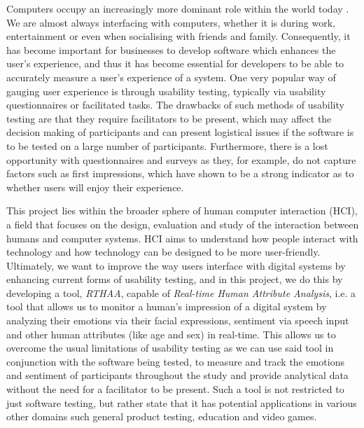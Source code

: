 \documentclass[12pt, a4paper]{article}
\newcommand{\np}
    {
    \vskip 0.4cm
    }
\begin{document}
Computers occupy an increasingly more dominant role within the world today \citep{statista}. We are almost always interfacing with computers, whether it is during work, entertainment or even when socialising with friends and family. Consequently, it has become important for businesses to develop software which enhances the user's experience, and thus it has become essential for developers to be able to accurately measure a user's experience of a system. One very popular way of gauging user experience is through usability testing, typically via usability questionnaires or facilitated tasks. The drawbacks of such methods of usability testing are that they require facilitators to be present, which may affect the decision making of participants and can present logistical issues if the software is to be tested on a large number of participants. Furthermore, there is a lost opportunity with questionnaires and surveys as they, for example, do not capture factors such as first impressions, which \cite{Lindgaard2006} have shown to be a strong indicator as to whether users will enjoy their experience. 
\np
This project lies within the broader sphere of human computer interaction (HCI), a field that focuses on the design, evaluation and study of the interaction between humans and computer systems. HCI aims to understand how people interact with technology and how technology can be designed to be more user-friendly. Ultimately, we want to improve the way users interface with digital systems by enhancing current forms of usability testing, and in this project, we do this by developing a tool, \textit{RTHAA}, capable of \textit{Real-time Human Attribute Analysis}, i.e. a tool that allows us to monitor a human's impression of a digital system by analyzing their emotions via their facial expressions, sentiment via speech input and other human attributes (like age and sex) in real-time. This allows us to overcome the usual limitations of usability testing as we can use said tool in conjunction with the software being tested, to measure and track the emotions and sentiment of participants throughout the study and provide analytical data without the need for a facilitator to be present. Such a tool is not restricted to just software testing, but rather \cite{applications} state that it has potential applications in various other domains such general product testing, education and video games.
\np
\end{document}
